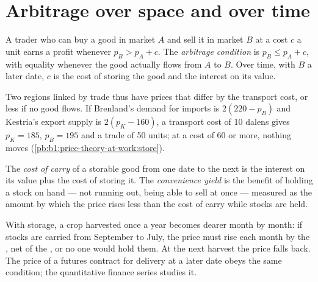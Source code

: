 \section{Arbitrage over space and over time}\label{sec:b1:price-theory-at-work:arbitrage}

\begin{definition}\label{def:b1:price-theory-at-work:arbitrage}
A trader who can buy a good in market $A$ and sell it in market $B$ at a
cost $c$ a unit earns a profit whenever $p_B > p_A + c$. The \emph{arbitrage
condition} is $p_B \le p_A + c$, with equality whenever the good actually flows
from $A$ to $B$. Over time, with $B$ a later date, $c$ is the cost of storing
the good and the interest on its value.
\end{definition}

Two regions linked by trade thus have prices that differ by the transport
cost, or less if no good flows. If Brenland's demand for imports is
$2(220 - p_B)$ and Kestria's export supply is $2(p_K - 160)$, a transport cost
of 10 dalens gives $p_K = 185$, $p_B = 195$ and a trade of 50 units; at a cost of
60 or more, nothing moves (\cref{pb:b1:price-theory-at-work:store}).

\begin{definition}\label{def:b1:price-theory-at-work:carry}
The \emph{cost of carry} of a storable good from one date to the next is the
interest on its value plus the cost of storing it. The \emph{convenience
yield} is the benefit of holding a stock on hand --- not running out, being
able to sell at once --- measured as the amount by which the price rises
less than the cost of carry while stocks are held.
\end{definition}

With storage, a crop harvested once a year becomes dearer month by month:
if stocks are carried from September to July, the price must rise each
month by the , net of the , or no one would
hold them. At the next harvest the price falls back. The price of a futures
contract for delivery at a later date obeys the same condition; the
quantitative finance series studies it.

